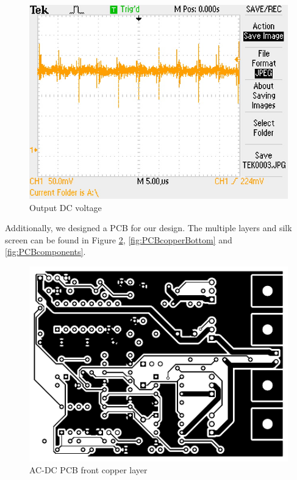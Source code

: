 \documentclass[final]{scrreprt} %
\begin{document}
\begin{figure}[h]
	\begin{center}
		\includegraphics[width=\linewidth/2]{resources/DC_out-rc.jpg}
	\end{center}
	\caption{Output DC voltage}
	\label{fig:DC_out}
\end{figure}

Additionally, we designed a PCB for our design. The multiple layers and silk screen can be found in Figure \ref{fig:PCBcopperTop},  \ref{fig:PCBcopperBottom} and  \ref{fig:PCBcomponents}.

\begin{figure}[h]
	\begin{center}
		\includegraphics[width=\linewidth/2]{resources/DC-AC-F_CU-rc.pdf}
	\end{center}
	\caption{AC-DC PCB front copper layer}
	\label{fig:PCBcopperTop}
\end{figure}
\end{document}
